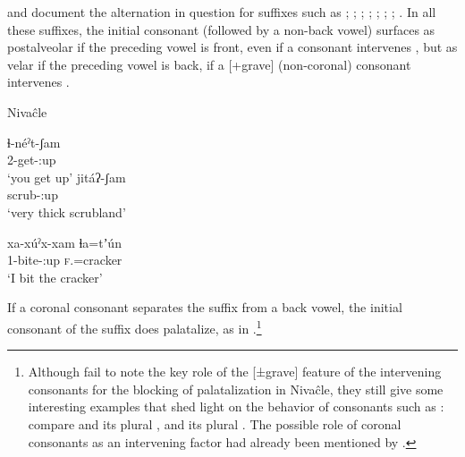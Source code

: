 \begin{exe}
    \ex \grove
    \ex \feminine
    \ex \vrbpl
    \ex \recipient
\end{exe}

\citet[64]{AnG15} and \citet[54–55]{LC20} document the alternation in question for suffixes such as ; ; ; ; ; ; ; . In all these suffixes, the initial consonant (followed by a non-back vowel) surfaces as postalveolar if the preceding vowel is front, even if a consonant intervenes , but as velar if the preceding vowel is back, if a [+grave] (non-coronal) consonant intervenes .

\newpage
\ea\label{ex:jamsham:1:niv}
Nivaĉle \citep[64]{AnG15}\\
    \begin{xlist}
        \ex\gll ɬ-néˀt-ʃam \\
                2{\SG}-get-{\LOC}:up\\
                \glt `you get up'
        \ex\gll jitáʔ-ʃam \\
                scrub-{\LOC}:up\\
                \glt `very thick scrubland'
    \end{xlist}
\z

\ea\label{ex:jamsham:2:niv}
\gll xa-xúˀx-xam ɬa=tʼún \\
     1{\SG}-bite-{\LOC}:up {\textsc{f}}.{\DET}=cracker \\
    \glt `I bit the cracker'
\z

If a coronal consonant separates the suffix from a back vowel, the initial consonant of the suffix does palatalize, as in .\footnote{Although \citet[54]{LC20} fail to note the key role of the [±grave] feature of the intervening consonants for the blocking of palatalization in Nivaĉle, they still give some interesting examples that shed light on the behavior of consonants such as : compare  and its plural ,  and its plural . The possible role of coronal consonants as an intervening factor had already been mentioned by \citet[66]{AnG15}.}

